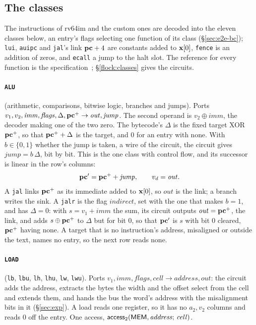 \subsection{The classes}\label{sec:tab-classes}

The instructions of rv64im and the custom ones are decoded into the eleven classes below, an entry's flags selecting one function of its class (\S\ref{sec:e2e-bc}); \texttt{lui}, \texttt{auipc} and \texttt{jal}'s link $\mathbf{pc}+4$ are constants added to $\mathbf{x}[0]$, \texttt{fence} is an addition of zeros, and \texttt{ecall} a jump to the halt slot. The reference for every function is the specification~\cite{riscv}; \S\ref{flock:classes} gives the circuits.

\paragraph{\texttt{ALU}} (arithmetic, comparisons, bitwise logic, branches and jumps). Ports $v_1,v_2,\mathit{imm},\mathit{flags},\Delta,\mathbf{pc}^{+}\to\mathit{out},\mathit{jump}$. The second operand is $v_2\oplus\mathit{imm}$, the decoder making one of the two zero. The bytecode's $\Delta$ is the fixed target XOR $\mathbf{pc}^{+}$, so that $\mathbf{pc}^{+}+\Delta$ is the target, and $0$ for an entry with none. With $b\in\{0,1\}$ whether the jump is taken, a wire of the circuit, the circuit gives $\mathit{jump}=b\,\Delta$, bit by bit. This is the one class with control flow, and its successor is linear in the row's columns:
\[
  \mathbf{pc}'=\mathbf{pc}^{+}+\mathit{jump},\qquad v_d=\mathit{out}.
\]
A \texttt{jal} links $\mathbf{pc}^{+}$ as its immediate added to $\mathbf{x}[0]$, so $\mathit{out}$ is the link; a branch writes the sink. A \texttt{jalr} is the flag $\mathit{indirect}$, set with the one that makes $b=1$, and has $\Delta=0$: with $s=v_1+\mathit{imm}$ the sum, its circuit outputs $\mathit{out}=\mathbf{pc}^{+}$, the link, and adds $s\oplus\mathbf{pc}^{+}$ to $\Delta$ but for bit $0$, so that $\mathbf{pc}'$ is $s$ with bit $0$ cleared, $\mathbf{pc}^{+}$ having none. A target that is no instruction's address, misaligned or outside the text, names no entry, so the next row reads none.

\paragraph{\texttt{LOAD}} (\texttt{lb}, \texttt{lbu}, \texttt{lh}, \texttt{lhu}, \texttt{lw}, \texttt{lwu}). Ports $v_1,\mathit{imm},\mathit{flags},\mathit{cell}\to\mathit{address},\mathit{out}$: the circuit adds the address, extracts the bytes the width and the offset select from the cell and extends them, and hands the bus the word's address with the misalignment bits in it (\S\ref{sec:exp}). A load reads one register, so it has no $a_2,v_2$ columns and reads $0$ off the entry. One access, $\mathsf{access}_{2}( \mathsf{MEM},\mathit{address};\,\mathit{cell} )$.

